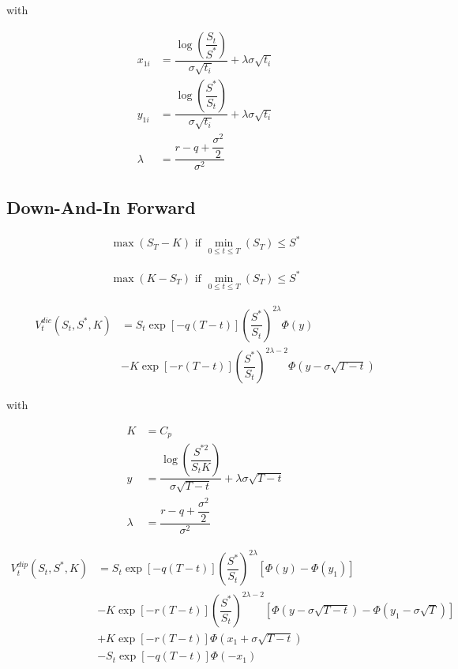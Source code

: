 with 

\begin{align*}
x_{1i} &= \dfrac{\log \left( \dfrac{S_t}{S^*} \right)}{\sigma \sqrt{t_i}} + \lambda \sigma \sqrt{t_i}\\
y_{1i} &= \dfrac{\log \left( \dfrac{S^*}{S_t} \right)}{\sigma \sqrt{t_i}} + \lambda \sigma \sqrt{t_i}\\
\lambda &= \dfrac{r-q+\dfrac{\sigma^2}{2}}{\sigma^2}
\end{align*}

\subsection{Down-And-In Forward}

\begin{align}
    \max \left( S_T - K \right) \text{ if } \min_{0\leq t\leq T} \left( S_T \right) \leq S^*
\end{align}

\begin{align}
    \max \left( K - S_T \right) \text{ if } \min_{0\leq t\leq T} \left( S_T \right) \leq S^*
\end{align}

\begin{align}
V_t^{ dic }\left( S_t , S^* , K \right) &= S_t \exp \left[ - q \left(T-t\right) \right] \left( \dfrac{ S^* }{ S_t } \right) ^ { 2 \lambda } \Phi\left( y \right)\nonumber \\ 
&- K \exp \left[ - r \left(T-t\right) \right] \left( \dfrac{ S^* }{ S_t } \right) ^ { 2 \lambda - 2} \Phi \left( y - \sigma \sqrt{T-t} \right)
\end{align}

with 

\begin{align*}
K &= C_p\\
y &= \dfrac{\log\left( \dfrac{S^{* 2}}{S_t K} \right)}{\sigma \sqrt{T-t}} + \lambda \sigma \sqrt{T-t}\\
\lambda &= \dfrac{r-q+\dfrac{\sigma^2}{2}}{\sigma^2}
\end{align*}

\begin{align}
V_t^{dip}\left( S_t, S^*, K \right) &=  S_t \exp\left[ -q\left(T-t\right) \right] \left( \dfrac{S^*}{S_t} \right)^{2\lambda} \left[ \Phi\left(y\right) - \Phi\left(y_1 \right) \right]\nonumber\\
&- K \exp\left[ -r\left(T-t\right) \right] \left(\dfrac{S^*}{S_t}\right)^{2\lambda-2}\left[ \Phi\left( y- \sigma \sqrt{T-t} \right) -\Phi \left( y_1 - \sigma \sqrt{T} \right) \right] \nonumber\\
&+ K \exp\left[ - r \left(T-t\right) \right] \Phi \left( x_1 + \sigma \sqrt{T-t} \right)\nonumber\\
 &-S_t \exp\left[ -q \left(T-t\right) \right] \Phi\left( -x_1 \right)
\end{align}

